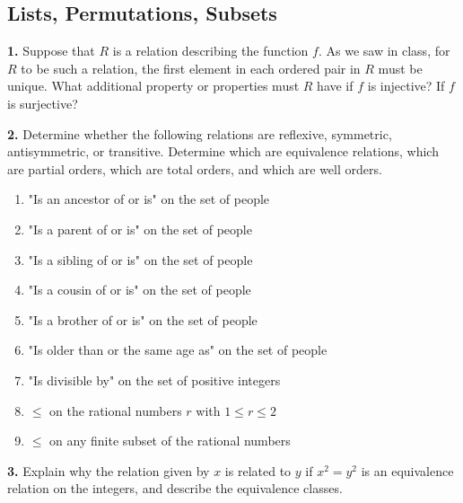 \documentclass[12pt, letterpaper]{article}
\theoremstyle{definition}
\begin{document}
\subsection*{Lists, Permutations, Subsets}

\vspace*{0.2in}\noindent
\textbf{1.} Suppose that $R$ is a relation describing the function $f$.
As we saw in class, for $R$ to be such a relation, the first element in each
ordered pair in $R$ must be unique. What additional
property or properties must $R$ have if $f$ is injective? If $f$ is
surjective?

\vspace*{0.3in}\noindent
\textbf{2.} Determine whether the following relations are reflexive, symmetric,
antisymmetric, or transitive. Determine which are equivalence relations,
which are partial orders, which are total orders, and which are well orders.
\begin{enumerate}[label=\textbf{\alph*.}]
    \item "Is an ancestor of or is" on the set of people
    \item "Is a parent of or is" on the set of people
    \item "Is a sibling of or is" on the set of people
    \item "Is a cousin of or is" on the set of people
    \item "Is a brother of or is" on the set of people
    \item "Is older than or the same age as" on the set of people
    \item "Is divisible by" on the set of positive integers
    \item $\leq$ on the rational numbers $r$ with $1 \leq r \leq 2$
    \item $\leq$ on any finite subset of the rational numbers
\end{enumerate}

\vspace*{0.3in}\noindent
\textbf{3.} Explain why the relation given by $x$ is related to $y$
if $x^2 = y^2$ is an equivalence relation on the integers, and describe the
equivalence classes.
\end{document}
